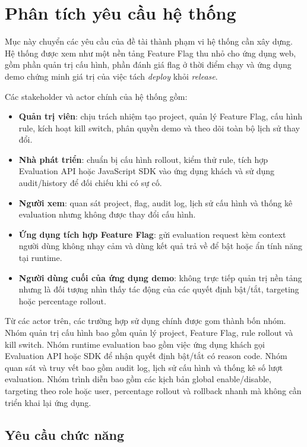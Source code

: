 \section{Phân tích yêu cầu hệ thống}

Mục này chuyển các yêu cầu của đề tài thành phạm vi hệ thống cần xây dựng. Hệ thống được xem như một nền tảng Feature Flag thu nhỏ cho ứng dụng web, gồm phần quản trị cấu hình, phần đánh giá flag ở thời điểm chạy và ứng dụng demo chứng minh giá trị của việc tách \textit{deploy} khỏi \textit{release}.

Các stakeholder và actor chính của hệ thống gồm:

\begin{itemize}
    \item \textbf{Quản trị viên}: chịu trách nhiệm tạo project, quản lý Feature Flag, cấu hình rule, kích hoạt kill switch, phân quyền demo và theo dõi toàn bộ lịch sử thay đổi.
    \item \textbf{Nhà phát triển}: chuẩn bị cấu hình rollout, kiểm thử rule, tích hợp Evaluation API hoặc JavaScript SDK vào ứng dụng khách và sử dụng audit/history để đối chiếu khi có sự cố.
    \item \textbf{Người xem}: quan sát project, flag, audit log, lịch sử cấu hình và thống kê evaluation nhưng không được thay đổi cấu hình.
    \item \textbf{Ứng dụng tích hợp Feature Flag}: gửi evaluation request kèm context người dùng không nhạy cảm và dùng kết quả trả về để bật hoặc ẩn tính năng tại runtime.
    \item \textbf{Người dùng cuối của ứng dụng demo}: không trực tiếp quản trị nền tảng nhưng là đối tượng nhìn thấy tác động của các quyết định bật/tắt, targeting hoặc percentage rollout.
\end{itemize}

Từ các actor trên, các trường hợp sử dụng chính được gom thành bốn nhóm. Nhóm quản trị cấu hình bao gồm quản lý project, Feature Flag, rule rollout và kill switch. Nhóm runtime evaluation bao gồm việc ứng dụng khách gọi Evaluation API hoặc SDK để nhận quyết định bật/tắt có reason code. Nhóm quan sát và truy vết bao gồm audit log, lịch sử cấu hình và thống kê số lượt evaluation. Nhóm trình diễn bao gồm các kịch bản global enable/disable, targeting theo role hoặc user, percentage rollout và rollback nhanh mà không cần triển khai lại ứng dụng.

\subsection{Yêu cầu chức năng}

